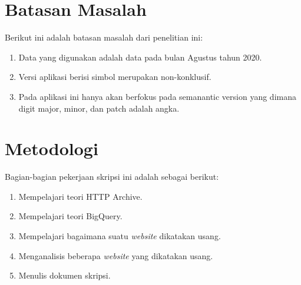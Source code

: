 \section{Batasan Masalah}
\label{sec:batasan}
Berikut ini adalah batasan masalah dari penelitian ini:
\begin{enumerate}
    \item Data yang digunakan adalah data pada bulan Agustus tahun 2020.
    \item Versi aplikasi berisi simbol merupakan non-konklusif.
    \item Pada aplikasi ini hanya akan berfokus pada semanantic version yang dimana digit major, minor, dan patch adalah angka.
\end{enumerate}

\section{Metodologi}
\label{sec:metlit}
Bagian-bagian pekerjaan skripsi ini adalah sebagai berikut:
\begin{enumerate}
	\item Mempelajari teori HTTP Archive.
	\item Mempelajari teori BigQuery.
	\item Mempelajari bagaimana suatu \textit{website} dikatakan usang.
	\item Menganalisis beberapa \textit{website} yang dikatakan usang.
	\item Menulis dokumen skripsi.
\end{enumerate}


